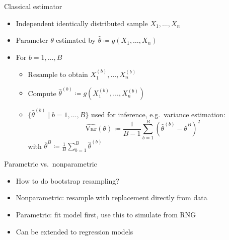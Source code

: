 \documentclass[tikz]{beamer}
\begin{document}
\begin{frame}{Classical estimator}
    \begin{itemize}
        \item Independent identically distributed sample $X_1, \dots, X_n$
        \item Parameter $\theta$ estimated by $\widehat{\theta} \coloneqq g(X_1, \dots, X_n)$
        \item For $b = 1, \dots, B$
              \begin{itemize}
                  \item Resample to obtain $X_1^{(b)}, \dots, X_n^{(b)}$
                  \item Compute $\widehat{\theta}^{(b)} \coloneqq g(X_1^{(b)}, \dots, X_n^{(b)})$
                  \item $\{ \widehat{\theta}^{(b)} \mid b = 1, \dots, B \}$ used for inference, e.g.\ variance estimation:
                        \begin{equation*}
                            \widehat{\mathrm{Var}}(\theta) \coloneqq \frac{1}{B - 1} \sum_{b = 1}^B (\widehat{\theta}^{(b)} - \overline{\theta}^{B})^2
                        \end{equation*}
                        with $\overline{\theta}^{B} \coloneqq \frac{1}{B} \sum_{b = 1}^B \widehat{\theta}^{(b)}$
              \end{itemize}
    \end{itemize}
\end{frame}

\begin{frame}{Parametric vs.\ nonparametric}
    \begin{itemize}
        \item How to do bootstrap resampling?
        \item Nonparametric: resample with replacement directly from data
        \item Parametric: fit model first, use this to simulate from RNG
        \item Can be extended to regression models
    \end{itemize}
\end{frame}
\end{document}
